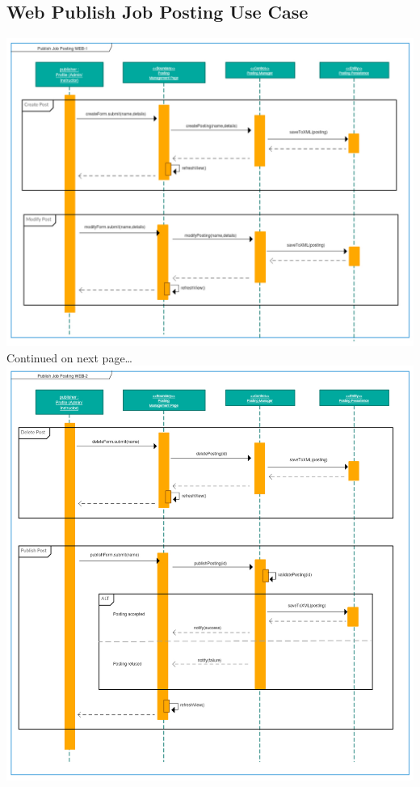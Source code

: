 \documentclass[12pt]{report}
\begin{document}
\subsection{Web Publish Job Posting Use Case}
\includegraphics[scale=0.73]{model/SEQUENCE/publish_webSEQUENCE1}\\
Continued on next page\dots\newpage
\includegraphics[scale=0.73]{model/SEQUENCE/publish_webSEQUENCE2}
\end{document}
